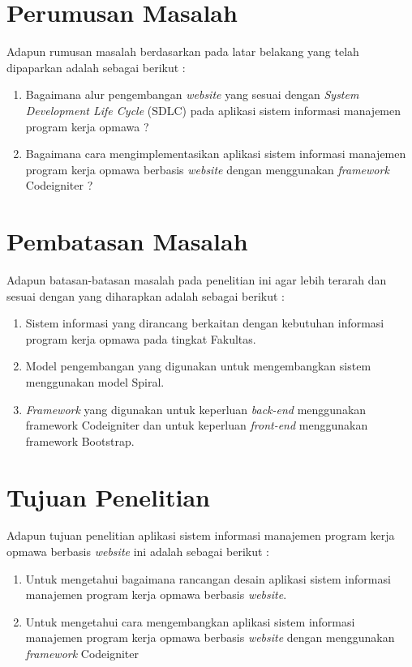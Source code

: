 \section{Perumusan Masalah}
Adapun rumusan masalah berdasarkan pada latar belakang yang telah dipaparkan adalah sebagai berikut :
\begin{enumerate}
	\item Bagaimana alur pengembangan \emph{website} yang sesuai dengan \textit{System Development Life Cycle} (SDLC) pada aplikasi sistem informasi manajemen program kerja opmawa ?
	
	\item Bagaimana cara mengimplementasikan aplikasi sistem informasi manajemen program kerja opmawa berbasis \emph{website} dengan menggunakan \emph{framework} Codeigniter ?
\end{enumerate}

\section{Pembatasan Masalah}
Adapun batasan-batasan masalah pada penelitian ini agar lebih terarah dan sesuai dengan yang diharapkan adalah sebagai berikut :
\begin{enumerate}
	\item Sistem informasi yang dirancang berkaitan dengan kebutuhan informasi program kerja opmawa pada tingkat Fakultas.
	\item Model pengembangan yang digunakan untuk mengembangkan sistem menggunakan model Spiral.
	\item \textit{Framework} yang digunakan untuk keperluan \textit{back-end} menggunakan framework Codeigniter dan untuk keperluan \textit{front-end} menggunakan framework Bootstrap.
\end{enumerate}

\section{Tujuan Penelitian}
Adapun tujuan penelitian aplikasi sistem informasi manajemen program kerja opmawa berbasis \emph{website} ini adalah sebagai berikut : 
\begin{enumerate}
	\item Untuk mengetahui bagaimana rancangan desain aplikasi sistem informasi manajemen program kerja opmawa berbasis \emph{website}.
	\item Untuk mengetahui cara mengembangkan aplikasi sistem informasi manajemen program kerja opmawa berbasis \emph{website} dengan menggunakan \emph{framework} Codeigniter
\end{enumerate}

